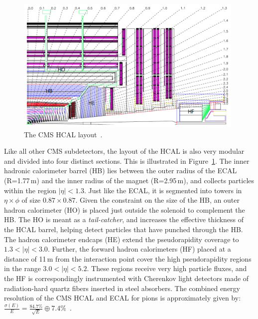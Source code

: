 \begin{figure}
  \begin{center}
    \captionsetup{justification=centering}
  \includegraphics[width=0.98\textwidth,keepaspectratio]{plots_and_figures/chapter3/hcal_layout.png}
\caption{The CMS HCAL layout~\cite{cms_exp_ref}.}
\label{fig:hcal_layout}
\end{center}
\end{figure}

Like all other CMS subdetectors, the layout of the HCAL is also very modular and divided into four distinct sections. This is illustrated in Figure~\ref{fig:hcal_layout}. The inner hadronic calorimeter barrel (HB) lies between the outer radius of the ECAL (R=1.77\,m) and the inner radius of the magnet (R=2.95\,m), and collects particles within the region $|\eta|<1.3$. Just like the ECAL, it is segmented into towers in $\eta\times\phi$ of size $0.87\times0.87$. Given the constraint on the size of the HB, an outer hadron calorimeter (HO) is placed just outside the solenoid to complement the HB. The HO is meant as a \textit{tail-catcher}, and increases the effective thickness of the HCAL barrel, helping detect particles that have punched through the HB. The hadron calorimeter endcaps (HE) extend the pseudorapidity coverage to $1.3 < |\eta| < 3.0$.  Further, the forward hadron calorimeters (HF) placed at a distance of 11\,m from the interaction point cover the high pseudorapidity regions in the range $3.0 < |\eta| < 5.2$. These regions receive very high particle fluxes, and the HF is correspondingly instrumented with Cherenkov light detectors made of radiation-hard quartz fibers inserted in steel absorbers. The combined energy resolution of the CMS HCAL and ECAL for pions is approximately given by: $\frac{\sigma(E)}{E}= \frac{84.7\%}{\sqrt{E}}\oplus7.4\%$~\cite{hcal2}.


